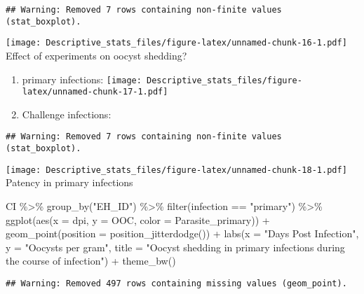 \documentclass[
]{article}
\newenvironment{Shaded}{\begin{snugshade}}{\end{snugshade}}
\newcommand{\AttributeTok}[1]{\textcolor[rgb]{0.77,0.63,0.00}{#1}}
\newcommand{\FunctionTok}[1]{\textcolor[rgb]{0.00,0.00,0.00}{#1}}
\newcommand{\NormalTok}[1]{#1}
\newcommand{\SpecialCharTok}[1]{\textcolor[rgb]{0.00,0.00,0.00}{#1}}
\newcommand{\StringTok}[1]{\textcolor[rgb]{0.31,0.60,0.02}{#1}}
\begin{document}
\begin{verbatim}
## Warning: Removed 7 rows containing non-finite values (stat_boxplot).
\end{verbatim}

\texttt{[image: Descriptive\_stats\_files/figure-latex/unnamed-chunk-16-1.pdf]}
Effect of experiments on oocyst shedding?

\begin{enumerate}
\def\labelenumi{\arabic{enumi}.}
\item
  primary infections:
  \texttt{[image: Descriptive\_stats\_files/figure-latex/unnamed-chunk-17-1.pdf]}
\item
  Challenge infections:
\end{enumerate}

\begin{verbatim}
## Warning: Removed 7 rows containing non-finite values (stat_boxplot).
\end{verbatim}

\texttt{[image: Descriptive\_stats\_files/figure-latex/unnamed-chunk-18-1.pdf]}
Patency in primary infections

\begin{Shaded}
\begin{Highlighting}[]
\NormalTok{CI }\SpecialCharTok{\%\textgreater{}\%}
  \FunctionTok{group\_by}\NormalTok{(}\StringTok{"EH\_ID"}\NormalTok{) }\SpecialCharTok{\%\textgreater{}\%}
  \FunctionTok{filter}\NormalTok{(infection }\SpecialCharTok{==} \StringTok{"primary"}\NormalTok{) }\SpecialCharTok{\%\textgreater{}\%}
  \FunctionTok{ggplot}\NormalTok{(}\FunctionTok{aes}\NormalTok{(}\AttributeTok{x =}\NormalTok{ dpi, }\AttributeTok{y =}\NormalTok{ OOC, }\AttributeTok{color =}\NormalTok{ Parasite\_primary)) }\SpecialCharTok{+}
  \FunctionTok{geom\_point}\NormalTok{(}\AttributeTok{position =} \FunctionTok{position\_jitterdodge}\NormalTok{()) }\SpecialCharTok{+}
  \FunctionTok{labs}\NormalTok{(}\AttributeTok{x =} \StringTok{"Days Post Infection"}\NormalTok{, }\AttributeTok{y =} \StringTok{"Oocysts per gram"}\NormalTok{,}
       \AttributeTok{title =} \StringTok{"Oocyst shedding in primary infections during the }
\StringTok{       course of infection"}\NormalTok{) }\SpecialCharTok{+}
    \FunctionTok{theme\_bw}\NormalTok{() }
\end{Highlighting}
\end{Shaded}

\begin{verbatim}
## Warning: Removed 497 rows containing missing values (geom_point).
\end{verbatim}
\end{document}
